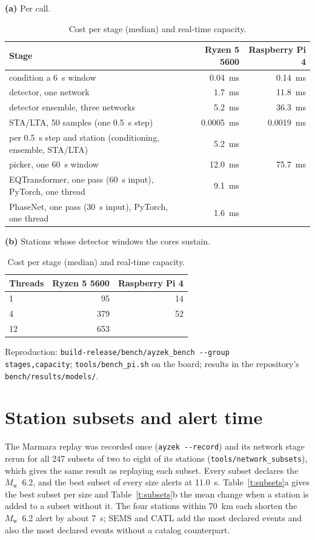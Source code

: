 \documentclass[11pt,a4paper]{article}
\newcommand{\Mw}{$M_\mathrm{w}$}
\newcommand{\stalta}{STA/LTA}
\newcommand{\tool}[1]{\nolinkurl{#1}}
\newcommand{\panel}[1]{\par\smallskip\noindent\textbf{(#1)}\enskip}
\begin{document}
\begin{table}[htbp]
  \centering\small
  \caption{Cost per stage (median) and real-time capacity.}\label{t:cost}
  \panel{a} Per call.\par\smallskip
  \begin{tabular}{@{}lrr@{}}
    \toprule
    Stage & Ryzen 5 5600 & Raspberry Pi 4 \\
    \midrule
    condition a 6~s window & 0.04~ms & 0.14~ms \\
    detector, one network & 1.7~ms & 11.8~ms \\
    detector ensemble, three networks & 5.2~ms & 36.3~ms \\
    \stalta{}, 50 samples (one 0.5~s step) & 0.0005~ms & 0.0019~ms \\
    per 0.5~s step and station (conditioning, ensemble, \stalta{}) & 5.2~ms & \\
    picker, one 60~s window & 12.0~ms & 75.7~ms \\
    \addlinespace
    EQTransformer, one pass (60~s input), PyTorch, one thread & 9.1~ms & \\
    PhaseNet, one pass (30~s input), PyTorch, one thread & 1.6~ms & \\
    \bottomrule
  \end{tabular}

  \bigskip
  \panel{b} Stations whose detector windows the cores sustain.\par\smallskip
  \begin{tabular}{@{}lrr@{}}
    \toprule
    Threads & Ryzen 5 5600 & Raspberry Pi 4 \\
    \midrule
    1 & 95 & 14 \\
    4 & 379 & 52 \\
    12 & 653 & \\
    \bottomrule
  \end{tabular}
\end{table}

\noindent Reproduction: \tool{build-release/bench/ayzek_bench --group
stages,capacity}; \tool{tools/bench_pi.sh} on the board; results in the
repository's \tool{bench/results/models/}.

\clearpage
\section{Station subsets and alert time}\label{s:subsets}

The Marmara replay was recorded once (\tool{ayzek --record}) and its network
stage rerun for all 247 subsets of two to eight of its stations
(\tool{tools/network_subsets}), which gives the same result as replaying each
subset. Every subset declares the \Mw{}~6.2, and the best subset of every size
alerts at 11.0~s. Table~\ref{t:subsets}a gives the best subset per size and
Table~\ref{t:subsets}b the mean change when a station is added to a subset
without it. The four stations within 70~km each shorten the \Mw{}~6.2 alert by
about 7~s; SEMS and CATL add the most declared events and also the most
declared events without a catalog counterpart.
\end{document}
